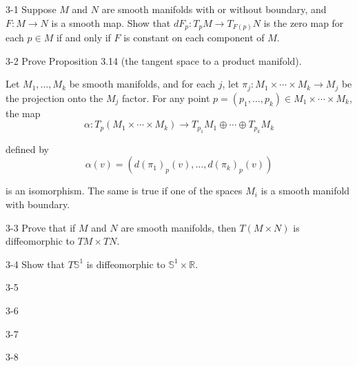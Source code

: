 \begin{problem}{3-1}
    Suppose \( M \) and \( N \) are smooth manifolds with or without boundary, and \( F: M \to N \) is a smooth map. Show that \( dF_{p}: T_{p}M \to T_{F(p)}N \) is the zero map for each \( p \in M \) if and only if \( F \) is constant on each component of \( M \).
\end{problem}

\begin{problem}{3-2}
    Prove Proposition 3.14 (the tangent space to a product manifold).

    Let \( M_{1}, \ldots, M_{k} \) be smooth manifolds, and for each \( j \), let \( \pi_{j}: M_{1} \times \cdots \times M_{k} \to M_{j} \) be the projection onto the \( M_{j} \) factor. For any point \( p = (p_{1}, \ldots, p_{k}) \in M_{1} \times \cdots \times M_{k} \), the map
    \[
        \alpha: T_{p}(M_{1} \times \cdots \times M_{k}) \to T_{p_{1}}M_{1} \oplus \cdots \oplus T_{p_{k}}M_{k}
    \]

    defined by
    \[
        \alpha(v) = (d{(\pi_{1})}_{p}(v), \ldots, d{(\pi_{k})}_{p}(v))
    \]

    is an isomorphism. The same is true if one of the spaces \( M_{i} \) is a smooth manifold with boundary.
\end{problem}

\begin{problem}{3-3}
    Prove that if \( M \) and \( N \) are smooth manifolds, then \( T(M \times N) \) is diffeomorphic to \( TM \times TN \).
\end{problem}

\begin{problem}{3-4}
    Show that \( T\mathbb{S}^{1} \) is diffeomorphic to \( \mathbb{S}^{1} \times \mathbb{R} \).
\end{problem}

\begin{problem}{3-5}
\end{problem}

\begin{problem}{3-6}
\end{problem}

\begin{problem}{3-7}
\end{problem}

\begin{problem}{3-8}
\end{problem}
